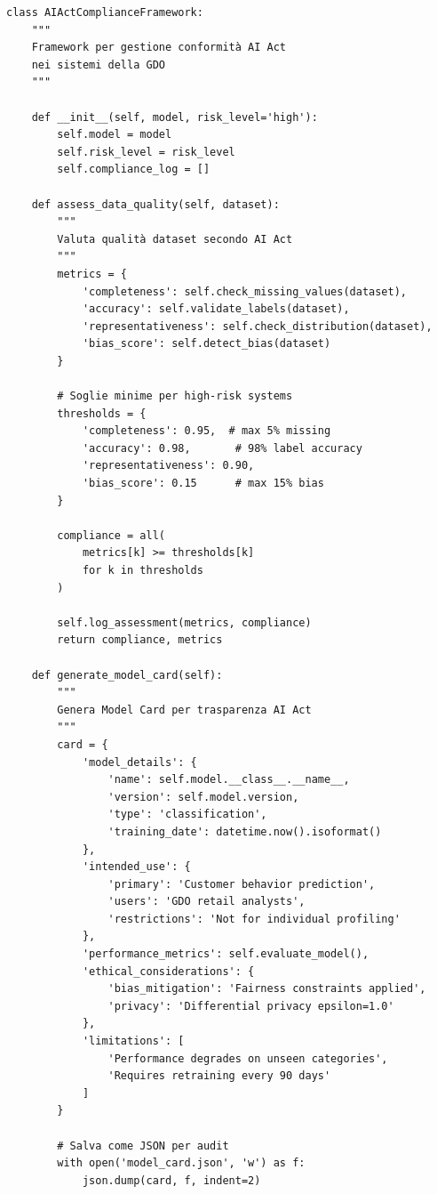 \begin{lstlisting}[caption={Framework Python per AI Act Compliance},label={lst:ai_compliance}]
class AIActComplianceFramework:
    """
    Framework per gestione conformità AI Act
    nei sistemi della GDO
    """
    
    def __init__(self, model, risk_level='high'):
        self.model = model
        self.risk_level = risk_level
        self.compliance_log = []
        
    def assess_data_quality(self, dataset):
        """
        Valuta qualità dataset secondo AI Act
        """
        metrics = {
            'completeness': self.check_missing_values(dataset),
            'accuracy': self.validate_labels(dataset),
            'representativeness': self.check_distribution(dataset),
            'bias_score': self.detect_bias(dataset)
        }
        
        # Soglie minime per high-risk systems
        thresholds = {
            'completeness': 0.95,  # max 5% missing
            'accuracy': 0.98,       # 98% label accuracy
            'representativeness': 0.90,
            'bias_score': 0.15      # max 15% bias
        }
        
        compliance = all(
            metrics[k] >= thresholds[k] 
            for k in thresholds
        )
        
        self.log_assessment(metrics, compliance)
        return compliance, metrics
    
    def generate_model_card(self):
        """
        Genera Model Card per trasparenza AI Act
        """
        card = {
            'model_details': {
                'name': self.model.__class__.__name__,
                'version': self.model.version,
                'type': 'classification',
                'training_date': datetime.now().isoformat()
            },
            'intended_use': {
                'primary': 'Customer behavior prediction',
                'users': 'GDO retail analysts',
                'restrictions': 'Not for individual profiling'
            },
            'performance_metrics': self.evaluate_model(),
            'ethical_considerations': {
                'bias_mitigation': 'Fairness constraints applied',
                'privacy': 'Differential privacy epsilon=1.0'
            },
            'limitations': [
                'Performance degrades on unseen categories',
                'Requires retraining every 90 days'
            ]
        }
        
        # Salva come JSON per audit
        with open('model_card.json', 'w') as f:
            json.dump(card, f, indent=2)
            

\end{lstlisting}
